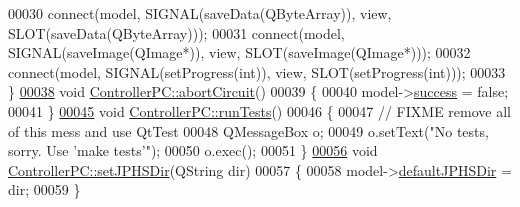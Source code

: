 \begin{DoxyCode}
00030     connect(model, SIGNAL(saveData(QByteArray)), view, SLOT(saveData(QByteArray)));
00031     connect(model, SIGNAL(saveImage(QImage*)), view, SLOT(saveImage(QImage*)));
00032     connect(model, SIGNAL(setProgress(\textcolor{keywordtype}{int})), view, SLOT(setProgress(\textcolor{keywordtype}{int})));
00033 \}
\hypertarget{controllerpc_8cpp_source_l00038}{}\hyperlink{class_controller_p_c_a8814989f7be1214e06b2e720889066b0}{00038} \textcolor{keywordtype}{void} \hyperlink{class_controller_p_c_a8814989f7be1214e06b2e720889066b0}{ControllerPC::abortCircuit}()
00039 \{
00040     model->\hyperlink{class_model_p_c_a945ffbbc44a832b953c191debd448f4c}{success} = \textcolor{keyword}{false};
00041 \}
\hypertarget{controllerpc_8cpp_source_l00045}{}\hyperlink{class_controller_p_c_aaa59fc90e1ef731eee4560ec87e43707}{00045} \textcolor{keywordtype}{void} \hyperlink{class_controller_p_c_aaa59fc90e1ef731eee4560ec87e43707}{ControllerPC::runTests}()
00046 \{
00047     \textcolor{comment}{// FIXME remove all of this mess and use QtTest}
00048     QMessageBox o;
00049     o.setText(\textcolor{stringliteral}{"No tests, sorry. Use 'make tests'"});
00050     o.exec();
00051 \}
\hypertarget{controllerpc_8cpp_source_l00056}{}\hyperlink{class_controller_p_c_ac00d29685a7e5b780c01eb438e10f96d}{00056} \textcolor{keywordtype}{void} \hyperlink{class_controller_p_c_ac00d29685a7e5b780c01eb438e10f96d}{ControllerPC::setJPHSDir}(QString dir)
00057 \{
00058     model->\hyperlink{class_model_p_c_abd038306f14f22fb885a1697c96d6335}{defaultJPHSDir} = dir;
00059 \}
\end{DoxyCode}
